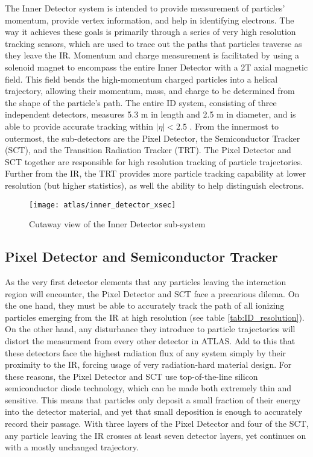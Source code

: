     The Inner Detector system is intended to provide measurement of particles' momentum, provide vertex information, and help in identifying electrons.
    The way it achieves these goals is primarily through a series of very high resolution tracking sensors, which are used to trace out the paths that particles traverse as they leave the IR. 
    Momentum and charge measurement is facilitated by using a solenoid magnet to encompass the entire Inner Detector with a 2T axial magnetic field.
    This field bends the high-momentum charged particles into a helical trajectory, allowing their momentum, mass, and charge to be determined from the shape of the particle's path.
    The entire ID system, consisting of three independent detectors, measures 5.3 m in length and 2.5 m in diameter, and is able to provide accurate tracking within $|\eta| < 2.5$ \cite{id_tdr}.
    From the innermost to outermost, the sub-detectors are the Pixel Detector, the Semiconductor Tracker (SCT), and the Transition Radiation Tracker (TRT).
    The Pixel Detector and SCT together are responsible for high resolution tracking of particle trajectories.
    Further from the IR, the TRT provides more particle tracking capability at lower resolution (but higher statistics), as well the ability to help distinguish electrons. 

    \begin{figure}
        \texttt{[image: atlas/inner\_detector\_xsec]}
        \caption{Cutaway view of the Inner Detector sub-system \cite{atlas_tdr}}
        \label{fig:inner_detector_xsec}
    \end{figure}

    


    \subsection{Pixel Detector and Semiconductor Tracker}
        As the very first detector elements that any particles leaving the interaction region will encounter, the Pixel Detector and SCT face a precarious dilema.
        On the one hand, they must be able to accurately track the path of all ionizing particles emerging from the IR at high resolution (see table \ref{tab:ID_resolution}).
        On the other hand, any disturbance they introduce to particle trajectories will distort the measurment from every other detector in ATLAS.
        Add to this that these detectors face the highest radiation flux of any system simply by their proximity to the IR, forcing usage of very radiation-hard material design.
        For these reasons, the Pixel Detector and SCT use top-of-the-line silicon semiconductor diode technology, which can be made both extremely thin and sensitive. 
        This means that particles only deposit a small fraction of their energy into the detector material, and yet that small deposition is enough to accurately record their passage.
        With three layers of the Pixel Detector and four of the SCT, any particle leaving the IR crosses at least seven detector layers, yet continues on with a mostly unchanged trajectory.

